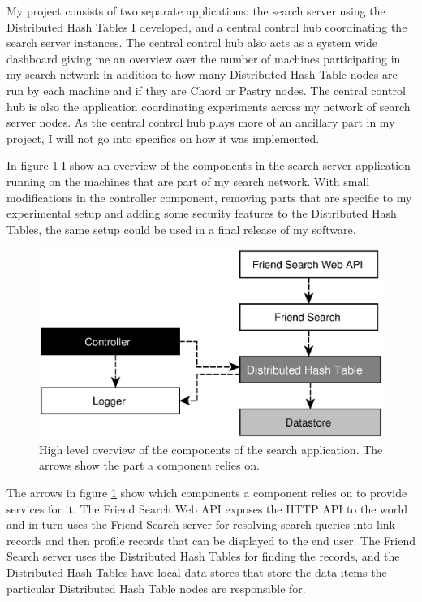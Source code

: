 \mbox{}

My project consists of two separate applications: the search server using the Distributed Hash Tables I developed, and a central control hub coordinating the search server instances.
The central control hub also acts as a system wide dashboard giving me an overview  over the number of machines participating in my search network in addition to how many Distributed Hash Table nodes are run by each machine and if they are Chord or Pastry nodes. The central control hub is also the application coordinating experiments across my network of search server nodes.
As the central control hub plays more of an ancillary part in my project, I will not go into specifics on how it was implemented.

In figure \ref{figComponents} I show an overview of the components in the search server application running on the machines that are part of my search network. With small modifications in the controller component, removing parts that are specific to my experimental setup and adding some security features to the Distributed Hash Tables, the same setup could be used in a final release of my software.

\begin{figure}[!htb]
\begin{center}
	\includegraphics[width=0.9\linewidth]{illustrations/ComponentOverview.eps}
\caption{High level overview of the components of the search application. The arrows show the part a component relies on.}
\label{figComponents}
\end{center}
\end{figure}

The arrows in figure \ref{figComponents} show which components a component relies on to provide services for it. The Friend Search Web API exposes the HTTP API to the world and in turn uses the Friend Search server for resolving search queries into link records and then profile records that can be displayed to the end user. The Friend Search server uses the Distributed Hash Tables for finding the records, and the Distributed Hash Tables have local data stores that store the data items the particular Distributed Hash Table nodes are responsible for.

